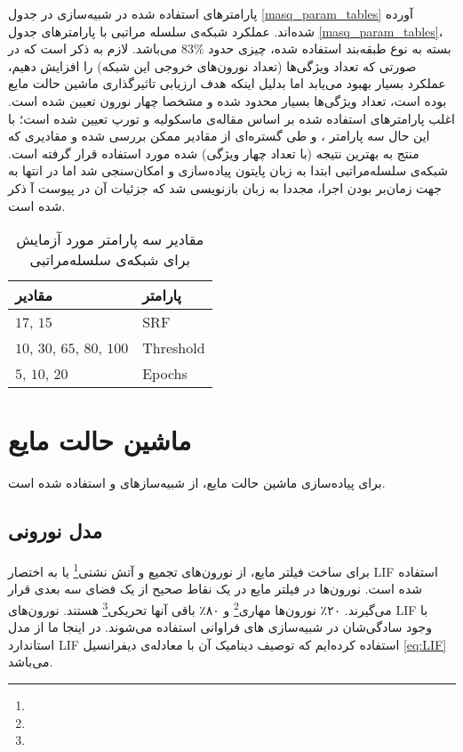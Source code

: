 پارامترهای استفاده شده در شبیه‌سازی در جدول \ref{masq_param_tables} آورده شده‌اند. عملکرد شبکه‌ی سلسله مراتبی با پارامتر‌های جدول \ref{masq_param_tables}، بسته به نوع طبقه‌بند استفاده شده، چیزی حدود $83\%$ می‌باشد. لازم به ذکر است که در صورتی که تعداد ویژگی‌ها (تعداد نورون‌های خروجی این شبکه) را افزایش دهیم، عملکرد بسیار بهبود می‌یابد اما بدلیل اینکه هدف ارزیابی تاثیرگذاری ماشین حالت مایع بوده است، تعداد ویژگی‌ها بسیار محدود شده و مشخصا چهار نورون تعیین شده است. اغلب پارامتر‌های استفاده شده بر اساس مقاله‌ی ماسکولیه و تورپ\cite{masquelier2007unsupervised} تعیین شده است؛ با این حال سه پارامتر ،  و  طی گستره‌ای از مقادیر ممکن بررسی شده و مقادیری که منتج به بهترین نتیجه (با تعداد چهار ویژگی) شده مورد استفاده قرار گرفته است. شبکه‌ی سلسله‌مراتبی ابتدا به زبان پایتون پیاده‌سازی و امکان‌سنجی شد اما در انتها به جهت زمان‌بر بودن اجرا، مجددا به زبان  بازنویسی شد که جزئیات آن در پیوست آ ذکر شده است. 

\begin{table}[]
\centering
\caption{مقادیر سه پارامتر مورد آزمایش برای شبکه‌ی سلسله‌مراتبی}
\label{my-label}
\begin{tabular}{|l|l|}
\hline
 مقادیر          &              پارامتر     \\ \hline
 $17$, $15$         &           SRF       \\ \hline
 $10$, $30$, $65$, $80$, $100$ & Threshold \\ \hline
 $5$, $10$, $20$         &      Epochs    \\ \hline
\end{tabular}
\end{table}

\section{ماشین حالت مایع}
برای پیاده‌سازی ماشین حالت مایع، از شبیه‌سازهای \cite{vitay2015annarchy} و \cite{goodman2009brian} استفاده شده است.
\subsection{مدل نورونی}
برای ساخت فیلتر مایع، از نورون‌های تجمیع و آتش نشتی\footnote{} یا به اختصار LIF استفاده شده است. نورون‌ها در فیلتر مایع در یک نقاط صحیح از یک فضای سه بعدی قرار می‌گیرند. ۲۰٪ نورون‌ها مهاری\footnote{} و ۸۰٪ باقی آنها تحریکی\footnote{} هستند. نورون‌های LIF با وجود سادگی‌شان در شبیه‌سازی های فراوانی استفاده می‌شوند\cite{eliasmith2004neural}. در اینجا ما از مدل استاندارد LIF استفاده کرده‌ایم که توصیف دینامیک آن با معادله‌ی دیفرانسیل \ref{eq:LIF} می‌باشد.

